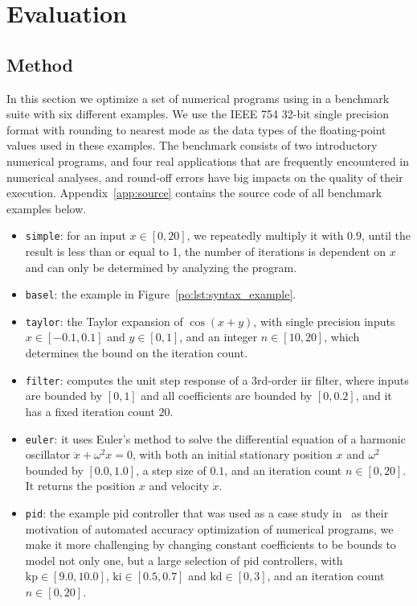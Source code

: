 \section{Evaluation}
\label{po:sec:results}

\subsection{Method}

In this section we optimize a set of numerical programs using \soap{} in a
benchmark suite with six different examples.  We use the IEEE 754 32-bit
single precision format with rounding to nearest mode as the data types of the
floating-point values used in these examples.  The benchmark consists of two
introductory numerical programs, and four real applications that are frequently
encountered in numerical analyses, and round-off errors have big impacts on the
quality of their execution.  Appendix~\ref{app:source} contains the source code
of all benchmark examples below.
\begin{itemize}

    \item \texttt{simple}: for an input $x \in [0, 20]$, we repeatedly multiply
    it with $0.9$, until the result is less than or equal to 1, the number of
    iterations is dependent on $x$ and can only be determined by analyzing the
    program.

    \item \texttt{basel}: the example in Figure~\ref{po:lst:syntax_example}.

    \item \texttt{taylor}: the Taylor expansion of $\cos(x + y)$, with single
    precision inputs $x \in [-0.1, 0.1]$ and $y \in [0, 1]$, and an integer $n
    \in [10, 20]$, which determines the bound on the iteration count.

    \item \texttt{filter}: computes the unit step response of a 3rd-order
    \gls{iir} filter, where inputs are bounded by $[0, 1]$ and all coefficients
    are bounded by $[0, 0.2]$, and it has a fixed iteration count $20$.

    \item \texttt{euler}: it uses Euler's method to solve the differential
    equation of a harmonic oscillator $\ddot{x} + \omega^2 x = 0$, with both an
    initial stationary position $x$ and $\omega^2$ bounded by $[0.0, 1.0]$, a
    step size of $0.1$, and an iteration count $n \in [0, 20]$.  It returns the
    position $x$ and velocity $\dot{x}$.

    \item \texttt{pid}: the example \gls{pid} controller that was used as a
    case study in~\cite{damouche14} as their motivation of automated accuracy
    optimization of numerical programs, we make it more challenging by changing
    constant coefficients to be bounds to model not only one, but a large
    selection of \gls{pid} controllers, with $\mathrm{kp} \in [9.0, 10.0]$,
    $\mathrm{ki} \in [0.5, 0.7]$ and $\mathrm{kd} \in [0, 3]$, and an iteration
    count $n \in [0, 20]$.

\end{itemize}

